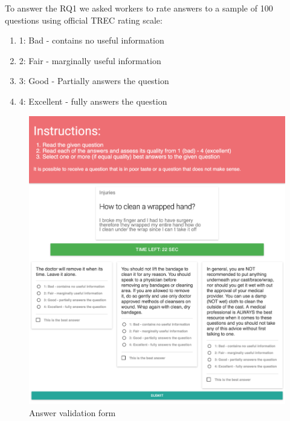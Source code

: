 \documentclass[11pt,letterpaper]{article}
\begin{document}
To answer the RQ1 we asked workers to rate answers to a sample of 100 questions using official TREC rating scale:
\begin{enumerate}
\item 1: Bad - contains no useful information
\item 2: Fair - marginally useful information
\item 3: Good - Partially answers the question
\item 4: Excellent - fully answers the question
\end{enumerate}

\begin{figure}[h!]
\includegraphics[width=1.0\linewidth]{img/validation_screenshot}
\caption{Answer validation form}
\label{fig:interfaces:validation}
\end{figure}
\end{document}
